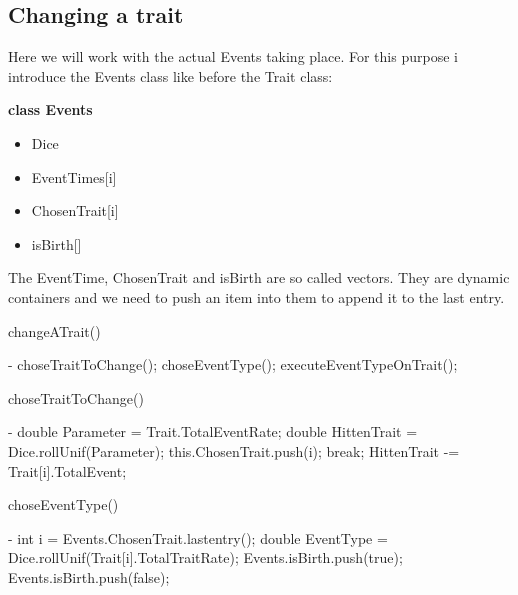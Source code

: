 \documentclass{article}
\begin{document}
\subsection{Changing a trait}
Here we will work with the actual Events taking place. For this purpose i introduce the Events class like before the Trait class:\\
\textcolor[rgb]{0,0,0.55}{\textbf{class Events}
\begin{itemize}
	\item Dice
	\item EventTimes[i]
	\item ChosenTrait[i]
	\item isBirth[]
\end{itemize}
}
The EventTime, ChosenTrait and isBirth are so called vectors. They are dynamic containers and we need to push an item into them to append it to the last entry.
\begin{algorithm}[H]
	\caption{changeATrait()}
	\begin{algorithmic}[1]
		\REQUIRE -
		\STATE choseTraitToChange();
		\STATE choseEventType();
		\STATE executeEventTypeOnTrait();
	\end{algorithmic}
\end{algorithm}

\begin{algorithm}[H]
	\caption{choseTraitToChange()}
	\begin{algorithmic}[1]
		\REQUIRE -
		\STATE double Parameter = Trait.TotalEventRate;
		\STATE double HittenTrait = Dice.rollUnif(Parameter);
				\STATE this.ChosenTrait.push(i);
				\STATE break;
			\ENDIF
			\STATE HittenTrait -= Trait[i].TotalEvent;
		\ENDFOR
	\end{algorithmic}
\end{algorithm}

\begin{algorithm}[H]
	\caption{choseEventType()}
	\begin{algorithmic}[1]
		\REQUIRE -
		\STATE int i = Events.ChosenTrait.lastentry();
		\STATE double EventType = Dice.rollUnif(Trait[i].TotalTraitRate);
			\STATE Events.isBirth.push(true);
		\ELSE
			\STATE Events.isBirth.push(false);
		\ENDIF
	\end{algorithmic}
\end{algorithm}
\end{document}
